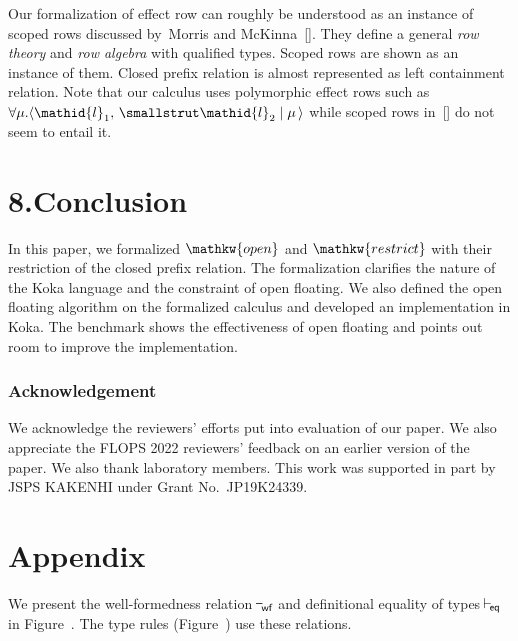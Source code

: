 \documentclass{llncs}
\newcommand{\midbar}{\mid}
\begin{document}
Our formalization of effect row can roughly be understood as
an instance of scoped rows discussed by~Morris and McKinna~[].
They define a general \emph{row theory} and \emph{row algebra} with qualified types.
Scoped rows are shown as an instance of them.
Closed prefix relation is almost represented as left containment relation.
Note that our calculus uses polymorphic effect rows such as $\mathpre{\forall \mu{}.\langle{}\mathid{l}_{1},~\mathid{l}_{2}\midbar{}\mu{}\,\rangle{}}$
while scoped rows in~[] do not seem to entail it.%






\section{8.\hspace*{0.5em}Conclusion}%

\noindent In this paper, we formalized $\mathpre{\mathkw{open}}$ and $\mathpre{\mathkw{restrict}}$ with their restriction of the closed prefix relation.
The formalization clarifies the nature of the Koka language and the constraint of open floating.
We also defined the open floating algorithm on the formalized calculus and developed an implementation in Koka.
The benchmark shows the effectiveness of open floating and points out room to improve the implementation.%

\subsubsection*{Acknowledgement}%


\noindent We acknowledge the reviewers' efforts put into evaluation of our paper.
We also appreciate the FLOPS 2022 reviewers' feedback on an earlier version of the paper.
We also thank laboratory members.%
This work was supported in part by JSPS KAKENHI under Grant No.~JP19K24339. 


\section*{Appendix}%


\noindent We present the well-formedness relation $\mathpre{\!\vdash_{\!\textsf{wf}}}$ and definitional equality of types $\mathpre{\!\vdash_{\!\textsf{eq}}}$ in Figure~.
The type rules (Figure~) use these relations.%
\end{document}
